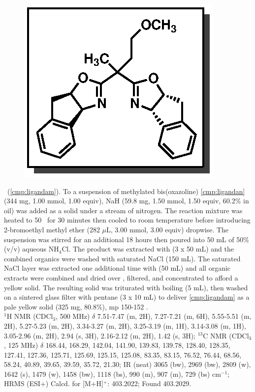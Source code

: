 \vspace{10pt}
\begin{figure}
  \vspace{-25pt}
  \begin{center}
    \includegraphics[scale=0.8]{chp_asymmetric/images/ligandam}
  \end{center}
  \vspace{-30pt}
\end{figure}
\noindent \textbf{\CMPligandam}\ (\ref{cmp:ligandam}). To a suspension of methylated bis(oxazoline)
\ref{cmp:ligandan} (344 mg, 1.00 mmol, 1.00 equiv), NaH (59.8 mg, 1.50 mmol, 1.50 equiv, 60.2\% in
oil) was added as a solid under a stream of nitrogen. The reaction mixture was heated to 50 \degc\  
for 30 minutes then cooled to room temperature before introducing 2-bromoethyl methyl ether (282
$\mu$L, 3.00 mmol, 3.00 equiv) dropwise. The suspension was stirred for an additional 18 hours
then poured into 50 mL of 50\% (v/v) aqueous NH$_4$Cl. The product was extracted with 
(3 x 50 mL) and the combined organics were washed with saturated NaCl (150 mL). The saturated NaCl
layer was extracted one additional time with \ce{CH2Cl2} (50 mL) and all organic extracts were
combined and dried over \ce{Na2SO4}, filtered, and concentrated to afford a yellow solid. The
resulting solid was triturated with boiling \ce{Et2O} (5 mL), then washed on a sintered glass filter
with pentane (3 x  10 mL) to deliver \ref{cmp:ligandam} as a pale yellow solid (325 mg, 80.8\%), mp
150-152 \degc. \\
$^1$H NMR (CDCl$_3$, 500 MHz) $\delta$ 7.51-7.47 (m, 2H), 7.27-7.21 (m, 6H), 5.55-5.51 (m, 2H),
5.27-5.23 (m, 2H), 3.34-3.27 (m, 2H), 3.25-3.19 (m, 1H), 3.14-3.08 (m, 1H), 3.05-2.96 (m, 2H), 2.94
(s, 3H), 2.16-2.12 (m, 2H), 1.42 (s, 3H); $^{13}$C NMR (CDCl$_3$, 125 MHz) $\delta$ 168.44, 168.29,
142.04, 141.90, 139.83, 139.78, 128.40, 128.35, 127.41, 127.36, 125.71, 125.69, 125.15, 125.08,
83.35, 83.15, 76.52, 76.44, 68.56, 58.24, 40.89, 39.65, 39.59, 35.72, 21.30; IR (neat)
3065 (bw), 2969 (bw), 2809 (w), 1642 (s), 1479 (w), 1458 (bw), 1118 (bs), 990 (m), 907
(m), 729 (bs) cm$^{-1}$; HRMS (ESI+) Calcd.
for  [M+H]$^+$: 403.2022; Found 403.2029.

